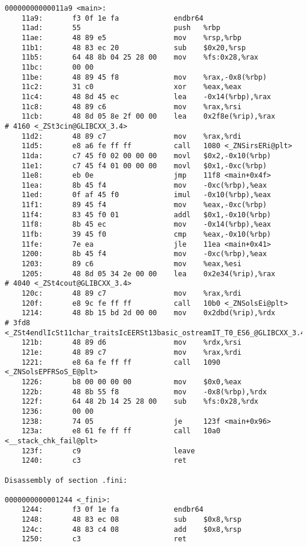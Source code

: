 \documentclass[UTF8,a4paper,10pt]{ctexart}
\begin{document}
\begin{lstlisting}[title=链接前后汇编代码对比,frame=trbl]
00000000000011a9 <main>:
    11a9:       f3 0f 1e fa             endbr64
    11ad:       55                      push   %rbp
    11ae:       48 89 e5                mov    %rsp,%rbp
    11b1:       48 83 ec 20             sub    $0x20,%rsp
    11b5:       64 48 8b 04 25 28 00    mov    %fs:0x28,%rax
    11bc:       00 00 
    11be:       48 89 45 f8             mov    %rax,-0x8(%rbp)
    11c2:       31 c0                   xor    %eax,%eax
    11c4:       48 8d 45 ec             lea    -0x14(%rbp),%rax
    11c8:       48 89 c6                mov    %rax,%rsi
    11cb:       48 8d 05 8e 2f 00 00    lea    0x2f8e(%rip),%rax        # 4160 <_ZSt3cin@GLIBCXX_3.4>
    11d2:       48 89 c7                mov    %rax,%rdi
    11d5:       e8 a6 fe ff ff          call   1080 <_ZNSirsERi@plt>
    11da:       c7 45 f0 02 00 00 00    movl   $0x2,-0x10(%rbp)
    11e1:       c7 45 f4 01 00 00 00    movl   $0x1,-0xc(%rbp)
    11e8:       eb 0e                   jmp    11f8 <main+0x4f>
    11ea:       8b 45 f4                mov    -0xc(%rbp),%eax
    11ed:       0f af 45 f0             imul   -0x10(%rbp),%eax
    11f1:       89 45 f4                mov    %eax,-0xc(%rbp)
    11f4:       83 45 f0 01             addl   $0x1,-0x10(%rbp)
    11f8:       8b 45 ec                mov    -0x14(%rbp),%eax
    11fb:       39 45 f0                cmp    %eax,-0x10(%rbp)
    11fe:       7e ea                   jle    11ea <main+0x41>
    1200:       8b 45 f4                mov    -0xc(%rbp),%eax
    1203:       89 c6                   mov    %eax,%esi
    1205:       48 8d 05 34 2e 00 00    lea    0x2e34(%rip),%rax        # 4040 <_ZSt4cout@GLIBCXX_3.4>
    120c:       48 89 c7                mov    %rax,%rdi
    120f:       e8 9c fe ff ff          call   10b0 <_ZNSolsEi@plt>
    1214:       48 8b 15 bd 2d 00 00    mov    0x2dbd(%rip),%rdx        # 3fd8 <_ZSt4endlIcSt11char_traitsIcEERSt13basic_ostreamIT_T0_ES6_@GLIBCXX_3.4>
    121b:       48 89 d6                mov    %rdx,%rsi
    121e:       48 89 c7                mov    %rax,%rdi
    1221:       e8 6a fe ff ff          call   1090 <_ZNSolsEPFRSoS_E@plt>
    1226:       b8 00 00 00 00          mov    $0x0,%eax
    122b:       48 8b 55 f8             mov    -0x8(%rbp),%rdx
    122f:       64 48 2b 14 25 28 00    sub    %fs:0x28,%rdx
    1236:       00 00 
    1238:       74 05                   je     123f <main+0x96>
    123a:       e8 61 fe ff ff          call   10a0 <__stack_chk_fail@plt>
    123f:       c9                      leave
    1240:       c3                      ret

Disassembly of section .fini:

0000000000001244 <_fini>:
    1244:       f3 0f 1e fa             endbr64
    1248:       48 83 ec 08             sub    $0x8,%rsp
    124c:       48 83 c4 08             add    $0x8,%rsp
    1250:       c3                      ret
\end{lstlisting}





\newpage

 
\end{document}

